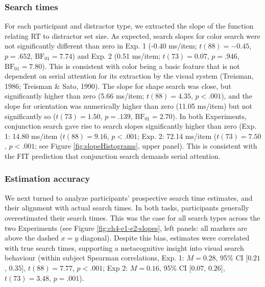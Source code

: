 \documentclass[12pt,twoside]{reedthesis}
\begin{document}
\hypertarget{search-times}{%
\subsubsection*{Search times}\label{search-times}}

For each participant and distractor type, we extracted the slope of the function relating RT to distractor set size. As expected, search slopes for color search were not significantly different than zero in Exp. 1 (-0.40 ms/item; \(t(88) = -0.45\), \(p = .652\), \(\mathrm{BF}_{\textrm{01}} = 7.74\)) and Exp. 2 (0.51 ms/item; \(t(73) = 0.07\), \(p = .946\), \(\mathrm{BF}_{\textrm{01}} = 7.80\)). This is consistent with color being a basic feature that is not dependent on serial attention for its extraction by the visual system (Treisman, 1986; Treisman \& Sato, 1990). The slope for shape search was close, but significantly higher than zero (5.66 ms/item; \(t(88) = 4.35\), \(p < .001\)), and the slope for orientation was numerically higher than zero (11.05 ms/item) but not significantly so (\(t(73) = 1.50\), \(p = .139\), \(\mathrm{BF}_{\textrm{01}} = 2.70\)). In both Experiments, conjunction search gave rise to search slopes significantly higher than zero (Exp. 1: 14.80 ms/item (\(t(88) = 9.16\), \(p < .001\); Exp. 2: 72.14 ms/item (\(t(73) = 7.50\), \(p < .001\); see Figure \ref{fig:slopeHistograms}, upper panel). This is consistent with the FIT prediction that conjunction search demands serial attention.

\hypertarget{estimation-accuracy}{%
\subsubsection*{Estimation accuracy}\label{estimation-accuracy}}

We next turned to analyze participants' prospective search time estimates, and their alignment with actual search times. In both tasks, participants generally overestimated their search times. This was the case for all search types across the two Experiments (see Figure \ref{fig:ch4-e1-e2-slopes}, left panels: all markers are above the dashed \(x=y\) diagonal). Despite this bias, estimates were correlated with true search times, supporting a metacognitive insight into visual search behaviour (within subject Spearman correlations, Exp. 1: \(M = 0.28\), 95\% CI \([0.21\), \(0.35]\), \(t(88) = 7.77\), \(p < .001\); Exp 2: \(M = 0.16\), 95\% CI \([0.07\), \(0.26]\), \(t(73) = 3.48\), \(p = .001\)).
\end{document}
